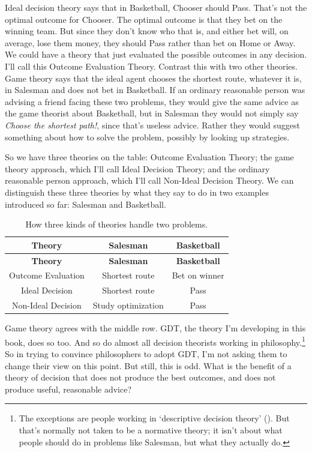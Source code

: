 \documentclass[
  12pt,
  letterpaper,
  DIV=11,
  numbers=noendperiod]{scrreprt}
\begin{document}
Ideal decision theory says that in Basketball, Chooser should Pass.
That's not the optimal outcome for Chooser. The optimal outcome is that
they bet on the winning team. But since they don't know who that is, and
either bet will, on average, lose them money, they should Pass rather
than bet on Home or Away. We could have a theory that just evaluated the
possible outcomes in any decision. I'll call this Outcome Evaluation
Theory. Contrast this with two other theories. Game theory says that the
ideal agent chooses the shortest route, whatever it is, in Salesman and
does not bet in Basketball. If an ordinary reasonable person was
advising a friend facing these two problems, they would give the same
advice as the game theorist about Basketball, but in Salesman they would
not simply say \emph{Choose the shortest path!}, since that's useless
advice. Rather they would suggest something about how to solve the
problem, possibly by looking up strategies.

So we have three theories on the table: Outcome Evaluation Theory; the
game theory approach, which I'll call Ideal Decision Theory; and the
ordinary reasonable person approach, which I'll call Non-Ideal Decision
Theory. We can distinguish these three theories by what they say to do
in two examples introduced so far: Salesman and Basketball.

\begin{longtable}[]{@{}ccc@{}}
\caption{How three kinds of theories handle two
problems.}\label{tbl-three-theories}\tabularnewline
\toprule\noalign{}
\textbf{Theory} & \textbf{Salesman} & \textbf{Basketball} \\
\midrule\noalign{}
\endfirsthead
\toprule\noalign{}
\textbf{Theory} & \textbf{Salesman} & \textbf{Basketball} \\
\midrule\noalign{}
\endhead
\bottomrule\noalign{}
\endlastfoot
Outcome Evaluation & Shortest route & Bet on winner \\
Ideal Decision & Shortest route & Pass \\
Non-Ideal Decision & Study optimization & Pass \\
\end{longtable}

Game theory agrees with the middle row. GDT, the theory I'm developing
in this book, does so too. And so do almost all decision theorists
working in philosophy.\footnote{The exceptions are people working in
  `descriptive decision theory' (). But that's normally not taken to be a normative theory; it
  isn't about what people should do in problems like Salesman, but what
  they actually do.} So in trying to convince philosophers to adopt GDT,
I'm not asking them to change their view on this point. But still, this
is odd. What is the benefit of a theory of decision that does not
produce the best outcomes, and does not produce useful, reasonable
advice?
\end{document}
